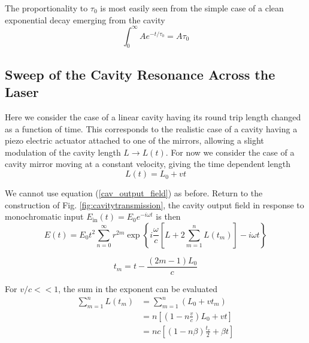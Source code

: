 The proportionality to $\tau_0$ is most easily seen from the simple case of a clean exponential decay emerging from the cavity
\begin{equation*}
	\int_{0}^{\infty} A e^{-t/\tau_0} = A\tau_0
\end{equation*}

\subsection{Sweep of the Cavity Resonance Across the Laser}
Here we consider the case of a linear cavity having its round trip length changed as a function of time. This corresponds to the realistic case of a cavity having a piezo electric actuator attached to one of the mirrors, allowing a slight modulation of the cavity length $L\rightarrow L(t)$. For now we consider the case of a cavity mirror moving at a constant velocity, giving the time dependent length
\begin{equation}
	L(t) = L_0 + vt
\end{equation}

We cannot use equation (\ref{cav_output_field}) as before. Return to the construction of Fig. \ref{fig:cavitytransmission}, the cavity output field in response to monochromatic input $E_\mathrm{in}(t) = E_0 e^{-i\omega t}$ is then \cite{crds_ultraslow_velocities, Gohle_Dissertation_2006}
\begin{equation}
	E(t) = E_0 t^2 \sum_{n=0}^{\infty}r^{2m}\exp\left\{i\frac{\omega}{c}\left[L + 2\sum_{m=1}^{n}L(t_m)\right] - i\omega t\right\}
\end{equation}

\begin{equation}
	t_m = t - \frac{(2m-1)L_0}{c}
\end{equation}


For $v/c<<1$, the sum in the exponent can be evaluated
\begin{align}
	\sum_{m=1}^{n}L(t_m) &= \sum_{m=1}^{n}\left(L_0 + v t_m\right) \\
	&= n\left[\left(1-n\frac{v}{c}\right)L_0 + vt\right] \\
	&= nc\left[(1-n\beta)\frac{t_r}{2} + \beta t\right]
\end{align}

